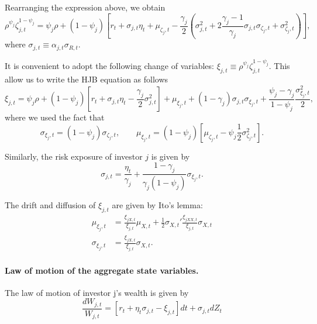 \documentclass[11pt,english]{article}
\begin{document}
Rearranging the expression above, we obtain
\begin{equation*}
    \rho^{\psi_j} \zeta_{j,t}^{1-\psi_j} = \psi_j \rho + (1-\psi_j) \left[ r_t + \sigma_{j,t} \eta_t + \mu_{\zeta_j,t} - \frac{\gamma_j}{2} \left( \sigma_{j,t}^2 + 2 \frac{\gamma_j-1}{\gamma_j} \sigma_{j,t} \sigma_{\zeta_j,t} + \sigma_{\zeta_{j},t}^2 \right)   \right],
\end{equation*}
where $\sigma_{j,t} \equiv \alpha_{j,t} \sigma_{R,t}$.

It is convenient to adopt the following change of variables: $\xi_{j,t} \equiv \rho^{\psi_j} \zeta_{j,t}^{1-\psi_j}$. This allow us to write the HJB equation as follows
\begin{equation*}
   \boxed{ \xi_{j,t} = \psi_j \rho + (1-\psi_j) \left[ r_t + \sigma_{j,t} \eta_t - \frac{\gamma_j}{2}  \sigma_{j,t}^2    \right] + \mu_{\xi_j,t} 
    + (1-\gamma_j) \sigma_{j,t} \sigma_{\xi_j,t}
    + \frac{\psi_j - \gamma_j}{1-\psi_j} \frac{\sigma_{\xi_j,t}^2}{2},}
\end{equation*}
where we used the fact that
\begin{equation*}
    \sigma_{\xi_j,t} = (1-\psi_j) \sigma_{\zeta_j,t}, \qquad 
    \mu_{\xi_j,t} = (1-\psi_j) \left[ \mu_{\zeta_j,t}- \psi_j \frac{1}{2} \sigma_{\zeta_j,t}^2\right].
\end{equation*}

Similarly, the risk exposure of investor $j$ is given by
\begin{equation}
    \boxed{\sigma_{j,t} = \frac{\eta_t}{\gamma_j} + \frac{1-\gamma_j}{\gamma_j (1-\psi_j)} \sigma_{\xi_j,t}}.
\end{equation}

The drift and diffusion of $\xi_{j,t}$ are given by Ito's lemma:
\begin{align}
    \mu_{\xi_j,t} &= \frac{\xi_{jX,t}}{\xi_{j,t}} \mu_{X,t} + \frac{1}{2} \sigma_{X,t}'  \frac{\xi_{jXX,t}}{\xi_{j,t}} \sigma_{X,t}\\
    \sigma_{\xi_j,t} &=  \frac{\xi_{jX,t}}{\xi_{j,t}} \sigma_{X,t}.
\end{align}

\paragraph{Law of motion of the aggregate state variables.} The law of motion of investor j's wealth is given by
\begin{equation*}
    \frac{d W_{j,t}}{W_{j,t}} = \left[ r_t + \eta_t \sigma_{j,t} - \xi_{j,t} \right] dt + \sigma_{j,t} d Z_t
\end{equation*}
\end{document}
